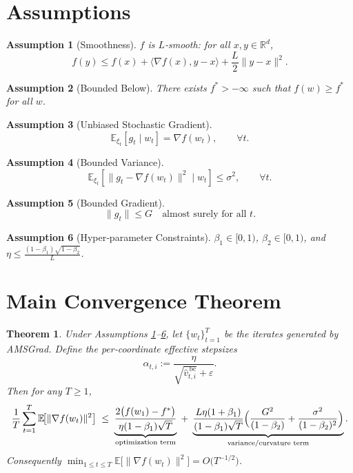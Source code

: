 \documentclass{article}
\newtheorem{theorem}{Theorem}
\newtheorem{assumption}{Assumption}
\begin{document}
\section*{Assumptions}
\begin{assumption}[Smoothness]\label{ass:smooth}
$f$ is $L$‑smooth: for all $x,y\in\mathbb{R}^{d}$,
\[
f(y)\le f(x)+\langle\nabla f(x),y-x\rangle+\frac{L}{2}\|y-x\|^{2}.
\]
\end{assumption}
\begin{assumption}[Bounded Below]\label{ass:lower}
There exists $f^{*}>-\infty$ such that $f(w)\ge f^{*}$ for all $w$.
\end{assumption}
\begin{assumption}[Unbiased Stochastic Gradient]\label{ass:unbiased}
\[
\mathbb{E}_{\xi_{t}}\!\left[g_{t}\mid w_{t}\right]=\nabla f(w_{t}),\qquad
\forall t.
\]
\end{assumption}
\begin{assumption}[Bounded Variance]\label{ass:variance}
\[
\mathbb{E}_{\xi_{t}}\!\left[\|g_{t}-\nabla f(w_{t})\|^{2}\mid w_{t}\right]\le\sigma^{2},
\qquad\forall t.
\]
\end{assumption}
\begin{assumption}[Bounded Gradient]\label{ass:gradbound}
\[
\|g_{t}\|\le G\quad\text{almost surely for all }t.
\]
\end{assumption}
\begin{assumption}[Hyper‑parameter Constraints]\label{ass:hyper}
$\beta_{1}\in[0,1)$, $\beta_{2}\in[0,1)$, and $\eta\le\frac{(1-\beta_{1})\sqrt{1-\beta_{2}}}{L}$.
\end{assumption}

\section*{Main Convergence Theorem}
\begin{theorem}\label{thm:amsgrad}
Under Assumptions \ref{ass:smooth}–\ref{ass:hyper}, let $\{w_{t}\}_{t=1}^{T}$ be the iterates generated by AMSGrad.
Define the per‑coordinate effective stepsizes
\[
\alpha_{t,i}:=\frac{\eta}{\sqrt{\hat v_{t,i}^{\,\text{bc}}}+\varepsilon}.
\]
Then for any $T\ge 1$,
\[
\frac{1}{T}\sum_{t=1}^{T}\mathbb{E}\!\bigl[\|\nabla f(w_{t})\|^{2}\bigr]
\;\le\;
\underbrace{\frac{2\bigl(f(w_{1})-f^{*}\bigr)}{\eta(1-\beta_{1})\sqrt{T}}}_{\text{optimization term}}
\;+\;
\underbrace{\frac{L\eta(1+\beta_{1})}{(1-\beta_{1})\sqrt{T}}
\Bigl(\frac{G^{2}}{(1-\beta_{2})}+\frac{\sigma^{2}}{(1-\beta_{2})^{2}}\Bigr)}_{\text{variance/curvature term}}.
\]
Consequently $\displaystyle\min_{1\le t\le T}\mathbb{E}\!\bigl[\|\nabla f(w_{t})\|^{2}\bigr]=O\!\bigl(T^{-1/2}\bigr)$.
\end{theorem}
\end{document}
